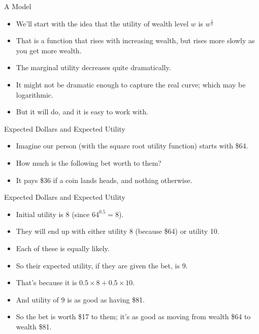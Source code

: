 \documentclass[
  ignorenonframetext,
]{beamer}
\providecommand{\tightlist}{%
  \setlength{\itemsep}{0pt}\setlength{\parskip}{0pt}}
\renewcommand{\,}{\text{, }}
\begin{document}
\begin{frame}{A Model}
\protect\hypertarget{a-model}{}

\begin{itemize}
\tightlist
\item
  We'll start with the idea that the utility of wealth level \(w\) is
  \(w^{\frac{1}{2}}\)
\item
  That is a function that rises with increasing wealth, but rises more
  slowly as you get more wealth.
\item
  The marginal utility decreases quite dramatically.
\item
  It might not be dramatic enough to capture the real curve; which may
  be logarithmic.
\item
  But it will do, and it is easy to work with.
\end{itemize}

\end{frame}

\begin{frame}{Expected Dollars and Expected Utility}
\protect\hypertarget{expected-dollars-and-expected-utility}{}

\begin{itemize}
\tightlist
\item
  Imagine our person (with the square root utility function) starts with
  \$64.
\item
  How much is the following bet worth to them?
\item
  It pays \$36 if a coin lands heads, and nothing otherwise.
\end{itemize}

\end{frame}

\begin{frame}{Expected Dollars and Expected Utility}
\protect\hypertarget{expected-dollars-and-expected-utility-1}{}

\begin{itemize}
\tightlist
\item
  Initial utility is 8 (since \(64^{0.5}=8\)).
\item
  They will end up with either utility 8 (because \$64) or utility 10.
\item
  Each of these is equally likely.
\item
  So their expected utility, if they are given the bet, is 9.
\item
  That's because it is \(0.5 \times 8 + 0.5 \times 10\).
\item
  And utility of 9 is as good as having \$81.
\item
  So the bet is worth \$17 to them; it's as good as moving from wealth
  \$64 to wealth \$81.
\end{itemize}

\end{frame}
\end{document}
